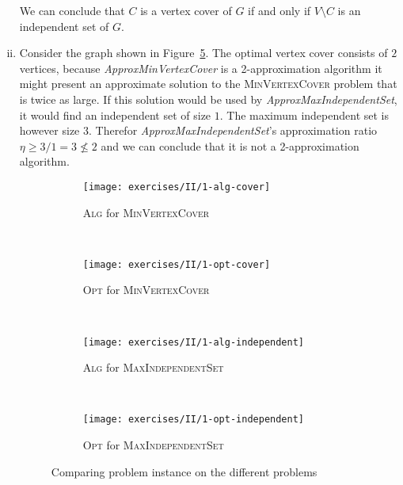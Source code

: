 \begin{enumerate}[(i)]
We can conclude that $C$ is a vertex cover of $G$ if and only if $V \setminus C$ is an independent set of $G$.
	\item Consider the graph shown in Figure~\ref{fig:set2:ex1}. The optimal vertex cover consists of $2$ vertices, because \emph{ApproxMinVertexCover} is a 2-approximation algorithm it might present an approximate solution to the \textsc{MinVertexCover} problem that is twice as large. If this solution would be used by \emph{ApproxMaxIndependentSet}, it would find an independent set of size $1$. The maximum independent set is however size $3$. Therefor \emph{ApproxMaxIndependentSet}'s approximation ratio $\eta \geq 3/1 = 3 \not \leq 2$ and we can conclude that it is not a 2-approximation algorithm.
		\begin{figure}[H]
			\centering
			\begin{subfigure}[b]{0.45\textwidth}
				\centering
				\texttt{[image: exercises/II/1-alg-cover]}
				\caption{\textsc{Alg} for \textsc{MinVertexCover}}
				\label{fig:set2:ex1:cover:alg}
			\end{subfigure}
			~
			\begin{subfigure}[b]{0.45\textwidth}
				\centering
				\texttt{[image: exercises/II/1-opt-cover]}
				\caption{\textsc{Opt} for \textsc{MinVertexCover}}
				\label{fig:set2:ex1:cover:opt}
			\end{subfigure}
			\\
			\begin{subfigure}[b]{0.45\textwidth}
				\centering
				\texttt{[image: exercises/II/1-alg-independent]}
				\caption{\textsc{Alg} for \textsc{MaxIndependentSet}}
				\label{fig:set2:ex1:cover:alg}
			\end{subfigure}
			~
			\begin{subfigure}[b]{0.45\textwidth}
				\centering
				\texttt{[image: exercises/II/1-opt-independent]}
				\caption{\textsc{Opt} for \textsc{MaxIndependentSet}}
				\label{fig:set2:ex1:cover:opt}
			\end{subfigure}
			\caption{Comparing problem instance on the different problems}
			\label{fig:set2:ex1}
		\end{figure}
\end{enumerate}
